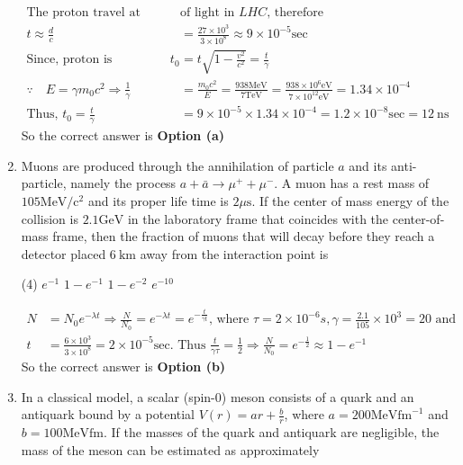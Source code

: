 \begin{enumerate}
\begin{answer}
\begin{align*}
		\text{The proton travel at nearly speed  }&\text{of light in $L H C$, therefore}\\
		t \approx \frac{d}{c}&=\frac{27 \times 10^3}{3 \times 10^8} \approx 9 \times 10^{-5} \mathrm{sec}\\
		\text{Since, proton is relativistic, }t_0&=t \sqrt{1-\frac{v^2}{c^2}}=\frac{t}{\gamma}\\
		\because \quad E=\gamma m_0 c^2 \Rightarrow \frac{1}{\gamma}&=\frac{m_0 c^2}{E}=\frac{938 \mathrm{MeV}}{7 \mathrm{TeV}}=\frac{938 \times 10^6 \mathrm{eV}}{7 \times 10^{12} \mathrm{eV}}=1.34 \times 10^{-4}\\
		\text{Thus, }t_0=\frac{t}{\gamma}&=9 \times 10^{-5} \times 1.34 \times 10^{-4}=1.2 \times 10^{-8} \mathrm{sec}=12 \mathrm{~ns}
		\end{align*}
		So the correct answer is \textbf{Option (a)}
	\end{answer}
	\item  Muons are produced through the annihilation of particle $a$ and its anti-particle, namely the process $a+\bar{a} \rightarrow \mu^{+}+\mu^{-}$. A muon has a rest mass of $105 \mathrm{MeV} / \mathrm{c}^2$ and its proper life time is $2 \mu \mathrm{s}$. If the center of mass energy of the collision is $2.1 \mathrm{GeV}$ in the laboratory frame that coincides with the center-of-mass frame, then the fraction of muons that will decay before they reach a detector placed $6 \mathrm{~km}$ away from the interaction point is
	{}
	\begin{tasks}(4)
		\task[\textbf{a.}]$e^{-1}$
		\task[\textbf{b.}]$1-e^{-1}$
		\task[\textbf{c.}] $1-e^{-2}$
		\task[\textbf{d.}]  $e^{-10}$
	\end{tasks}
	\begin{answer}
		\begin{align*}
		N&=N_0 e^{-\lambda t} \Rightarrow \frac{N}{N_0}=e^{-\lambda t}=e^{-\frac{t}{\gamma t}} \text {, where } \tau=2 \times 10^{-6} s, \gamma=\frac{2.1}{105} \times 10^3=20 \text { and }\\
		t&=\frac{6 \times 10^3}{3 \times 10^8}=2 \times 10^{-5} \mathrm{sec} \text {. Thus } \frac{t}{\gamma \tau}=\frac{1}{2} \Rightarrow \frac{N}{N_0}=e^{-\frac{1}{2}} \approx 1-e^{-1}
		\end{align*}
		So the correct answer is \textbf{Option (b)}
	\end{answer}
	\item  In a classical model, a scalar (spin-0) meson consists of a quark and an antiquark bound by a potential $V(r)=a r+\frac{b}{r}$, where $a=200 \mathrm{MeV} \mathrm{fm}^{-1}$ and $b=100 \mathrm{MeV} \mathrm{fm}$. If the masses of the quark and antiquark are negligible, the mass of the meson can be estimated as approximately

\end{enumerate}
